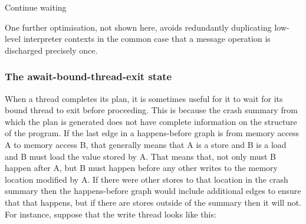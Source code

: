\begin{algorithmic}[1]
  \ENDIF

      \ELSE
        \STATE Continue waiting
      \ENDIF
    \ENDFOR
  \ENDWHILE

    \ENDIF
    \ELSE
      \STATE {} 
    \ENDIF
  \ENDFOR

\end{algorithmic}

One further optimisation, not shown here, avoids redundantly duplicating low-level interpreter contexts in the common case that a message operation is discharged precisely once.


\subsubsection{The await-bound-thread-exit state}

When a thread completes its plan, it is sometimes useful for it to wait for its bound thread to exit before proceeding.
This is because the crash summary from which the plan is generated does not have complete information on the structure of the program.
If the last edge in a happens-before graph is from memory access A to memory access B, that generally means that A is a store and B is a load and B must load the value stored by A.
That means that, not only must B happen after A, but B must happen before any other writes to the memory location modified by A.
If there were other stores to that location in the crash summary then the happens-before graph would include additional edges to ensure that that happens, but if there are stores outside of the summary then it will not.
For instance, suppose that the write thread looks like this:

